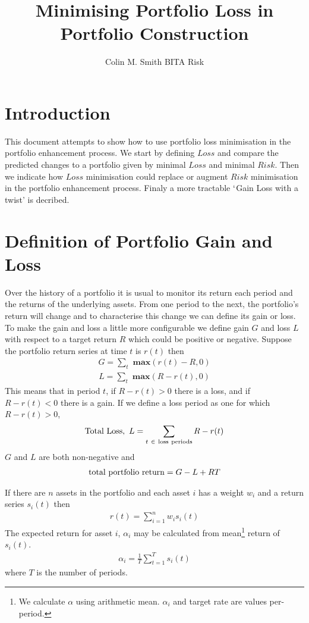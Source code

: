 \documentclass[12pt]{article}
\title{Minimising Portfolio Loss in Portfolio Construction}
\author{Colin M. Smith BITA Risk}
\begin{document}
\maketitle
\tableofcontents
\pagebreak
\doublespacing
\section{Introduction}
This document attempts to show how to use portfolio loss minimisation in the
portfolio enhancement process. We start by defining $Loss$ and compare
the predicted changes to a portfolio given by minimal $Loss$ and minimal $Risk$. Then we indicate how 
$Loss$ minimisation could replace or augment $Risk$ minimisation in the portfolio enhancement process.
Finaly a more tractable $`$Gain Loss with a twist' is decribed.
\section{Definition of Portfolio Gain and Loss}
Over the history of a portfolio it is usual to monitor its return each period and the returns of the underlying assets.
From one period  to the next, the portfolio's return will change and to characterise this change we can define its gain or loss.
To make the gain and loss a little more configurable we define 
gain $G$ and loss $L$ with respect to a target return $R$ which could be positive or negative.
Suppose the portfolio return series at time $t$ is $r(t)$ then
\begin{eqnarray}
    G = \sum_t {\textbf{ max} }(r(t) - R,0)
\end{eqnarray}
\begin{eqnarray}
    L = \sum_t {\textbf{ max} }(R-r(t),0)
\end{eqnarray}
This means that in period $t$, if $R-r(t) > 0$ there is a loss, and if $R-r(t) < 0$ there is a gain.
If we define a loss period as one for which $R-r(t) > 0$,
\begin{eqnarray}
  {\rm Total\ Loss},\ L= \sum_{t\ \in\ \rm loss\ periods} R-r(t)
\end{eqnarray}
$G$ and $L$ are both non-negative and
\begin{eqnarray}
 {\rm   total\ portfolio\ return}= G - L + RT
\end{eqnarray}

If there are $n$ assets in the portfolio and each asset $i$
has a weight $w_i$ and a return series $s_i (t)$ then
\begin{eqnarray}
    r(t) = \sum_{i=1}^{n} w_i s_i(t)
\end{eqnarray}
The expected return for asset $i$, $\alpha_i$ may be calculated from
mean\footnote{We calculate $\alpha$ using arithmetic mean. $\alpha_i$ and target rate are values per-period.} 
return of $s_i(t)$.
\begin{eqnarray}
    \alpha_i =  \frac{1}{T}\sum_{t=1}^{T} s_i(t)
\end{eqnarray}
where $T$ is the number of periods.
\end{document}
